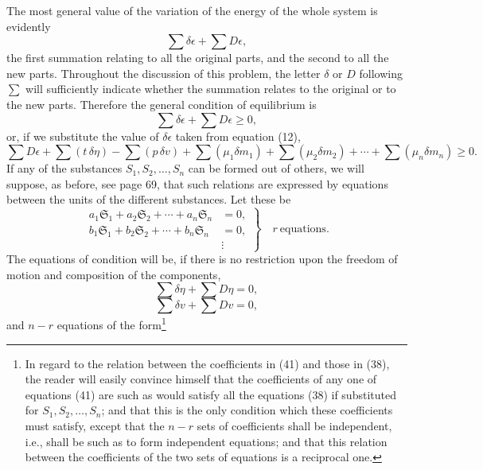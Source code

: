 \documentclass[11pt]{article}
\newcommand{\unit}[1]{\mathfrak{S}_{#1}}
\begin{document}
The most general value of the variation of the energy of the whole system is evidently
\begin{equation}
\sum\delta\epsilon+\sum D\epsilon,
\end{equation}
the first summation relating to all the original parts, and the second to all the new parts. Throughout the discussion of this problem, the letter \(\delta\) or \(D\) following \(\sum\) will sufficiently indicate whether the summation relates to the original or to the new parts. Therefore the general condition of equilibrium is
\begin{equation}
\sum\delta\epsilon+\sum D\epsilon\geq 0,
\end{equation}
or, if we substitute the value of \(\delta\epsilon\) taken from equation (12),
\begin{equation}
\sum D\epsilon+\sum(t\,\delta\eta)-\sum(p\,\delta v)
+\sum(\mu_1\delta m_1)+\sum(\mu_2\delta m_2)+\cdots
+\sum(\mu_n\delta m_n)\geq 0.
\end{equation}
If any of the substances \(S_1,S_2,\ldots,S_n\) can be formed out of others, we will suppose, as before, see page 69, that such relations are expressed by equations between the units of the different substances. Let these be
\begin{equation}
\left.
\begin{aligned}
a_1\unit{1}+a_2\unit{2}+\cdots+a_n\unit{n}&=0,\\
b_1\unit{1}+b_2\unit{2}+\cdots+b_n\unit{n}&=0,\\
&\vdots
\end{aligned}
\right\}
\quad r\ \text{equations}.
\end{equation}
The equations of condition will be, if there is no restriction upon the freedom of motion and composition of the components,
\begin{equation}
\sum\delta\eta+\sum D\eta=0,
\end{equation}
\begin{equation}
\sum\delta v+\sum Dv=0,
\end{equation}
and \(n-r\) equations of the form\footnote{In regard to the relation between the coefficients in (41) and those in (38), the reader will easily convince himself that the coefficients of any one of equations (41) are such as would satisfy all the equations (38) if substituted for \(S_1,S_2,\ldots,S_n\); and that this is the only condition which these coefficients must satisfy, except that the \(n-r\) sets of coefficients shall be independent, i.e., shall be such as to form independent equations; and that this relation between the coefficients of the two sets of equations is a reciprocal one.}
\end{document}
